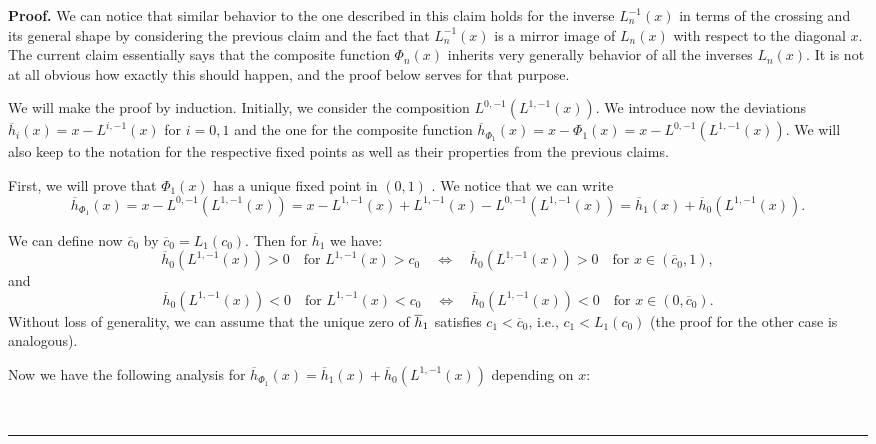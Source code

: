 \documentclass[onecolumn]{article}
\newenvironment{proof}[1][Proof]{\noindent\textbf{#1.} }{\ \rule{0.5em}{0.5em}}
\begin{document}
\begin{proof}
We can notice that similar behavior to the one described in this claim holds
for the inverse $L_{n}^{-1}(x)$ in terms of the crossing and its general
shape by considering the previous claim and the fact that $L_{n}^{-1}(x)$ is
a mirror image of $L_{n}(x)$ with respect to the diagonal $x$. The current
claim essentially says that the composite function $\Phi _{n}(x)$ inherits
very generally behavior of all the inverses $L_{n}(x)$. It is not at all
obvious how exactly this should happen, and the proof below serves for that
purpose.

We will make the proof by induction. Initially, we consider the composition $%
L^{0,-1}(L^{1,-1}(x))$. We introduce now the deviations $\overline{h}%
_{i}(x)=x-L^{i,-1}(x)$ for $i=0,1$ and the one for the composite function $%
\overline{h}_{\Phi _{1}}(x)=x-\Phi _{1}(x)=x-L^{0,-1}(L^{1,-1}(x)).$ We will
also keep to the notation for the respective fixed points as well as their
properties from the previous claims.

First, we will prove that $\Phi _{1}(x)$ has a unique fixed point in $(0,1)$%
. We notice that we can write%
\begin{equation}
\overline{h}_{\Phi
_{1}}(x)=x-L^{0,-1}(L^{1,-1}(x))=x-L^{1,-1}(x)+L^{1,-1}(x)-L^{0,-1}(L^{1,-1}(x))=%
\overline{h}_{1}(x)+\overline{h}_{0}(L^{1,-1}(x)).  \label{173}
\end{equation}

We can define now $\overline{c}_{0}$ by $\overline{c}_{0}=L_{1}(c_{0})$.
Then for $\overline{h}_{1}$ we have: 
\begin{equation}
\overline{h}_{0}(L^{1,-1}(x))>0\quad \text{for }L^{1,-1}(x)>c_{0}\quad
\Longleftrightarrow \quad \overline{h}_{0}(L^{1,-1}(x))>0\quad \text{for }%
x\in (\overline{c}_{0},1),  \label{174}
\end{equation}%
and 
\begin{equation}
\overline{h}_{0}(L^{1,-1}(x))<0\quad \text{for }L^{1,-1}(x)<c_{0}\quad
\Longleftrightarrow \quad \overline{h}_{0}(L^{1,-1}(x))<0\quad \text{for }%
x\in (0,\overline{c}_{0}).  \label{175}
\end{equation}%
Without loss of generality, we can assume that the unique zero of $\overline{%
h}_{1}$ satisfies $c_{1}<\overline{c}_{0}$, i.e., $c_{1}<L_{1}(c_{0})$ (the
proof for the other case is analogous).

Now we have the following analysis for $\overline{h}_{\Phi _{1}}(x)=%
\overline{h}_{1}(x)+\overline{h}_{0}(L^{1,-1}(x))$ depending on $x:$


\end{proof}
\end{document}
